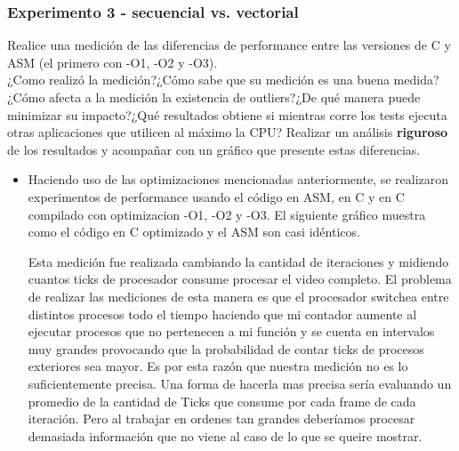 \vspace*{0.3cm} \noindent
\subsubsection{Experimento 3 - secuencial vs. vectorial}

	Realice una medición de las diferencias de performance entre las versiones
	de C y ASM (el primero con -O1, -O2 y -O3).\\
	¿Como realizó la medición?¿Cómo sabe que su medición es una buena medida?¿Cómo afecta a la medición la existencia de outliers?¿De qué manera puede minimizar su impacto?¿Qué resultados obtiene si mientras corre los tests ejecuta otras aplicaciones que utilicen al máximo la CPU? 
	Realizar un análisis \textbf{riguroso} de los resultados y acompañar con un gráfico que presente estas diferencias.
	\vspace*{0.3cm} \noindent
	\begin{itemize}
	 \item Haciendo uso de las optimizaciones mencionadas anteriormente, se realizaron experimentos de performance usando el c\'odigo en ASM, en C y en C 
	  compilado con optimizacion -O1, -O2 y -O3. El siguiente gr\'afico muestra como el c\'odigo en C optimizado y el ASM son casi id\'enticos.	

\begin{center}
\end{center}

Esta medici\'on fue realizada cambiando la cantidad de iteraciones y midiendo cuantos ticks de procesador consume procesar el video completo. El 
problema de realizar las mediciones de esta manera es que el procesador switchea entre distintos procesos todo el tiempo haciendo que mi contador aumente
 al ejecutar procesos que no pertenecen a mi funci\'on y se cuenta en intervalos muy grandes provocando que la probabilidad de contar ticks de procesos
 exteriores sea mayor. Es por esta raz\'on que nuestra medici\'on no es lo suficientemente precisa. Una forma de hacerla mas precisa ser\'ia evaluando un
promedio de la cantidad de Ticks que consume por cada frame de cada iteraci\'on. Pero al trabajar en ordenes tan grandes deber\'iamos procesar demasiada
 informaci\'on que no viene al caso de lo que se queire mostrar.\newline

\end{itemize}

\vspace*{0.3cm} \noindent
